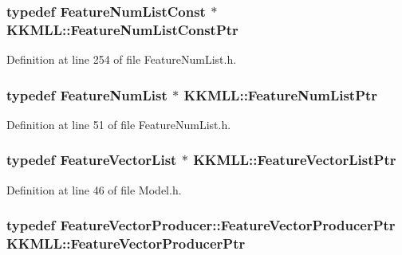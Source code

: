 \subsubsection[{\texorpdfstring{Feature\+Num\+List\+Const\+Ptr}{FeatureNumListConstPtr}}]{\setlength{\rightskip}{0pt plus 5cm}typedef {\bf Feature\+Num\+List\+Const} $\ast$ {\bf K\+K\+M\+L\+L\+::\+Feature\+Num\+List\+Const\+Ptr}}\hypertarget{namespace_k_k_m_l_l_a81284b0a14973267260023f9a72da94a}{}\label{namespace_k_k_m_l_l_a81284b0a14973267260023f9a72da94a}


Definition at line 254 of file Feature\+Num\+List.\+h.

\subsubsection[{\texorpdfstring{Feature\+Num\+List\+Ptr}{FeatureNumListPtr}}]{\setlength{\rightskip}{0pt plus 5cm}typedef {\bf Feature\+Num\+List} $\ast$ {\bf K\+K\+M\+L\+L\+::\+Feature\+Num\+List\+Ptr}}\hypertarget{namespace_k_k_m_l_l_a66661b68121fdcc4154fb73813696dcc}{}\label{namespace_k_k_m_l_l_a66661b68121fdcc4154fb73813696dcc}


Definition at line 51 of file Feature\+Num\+List.\+h.

\subsubsection[{\texorpdfstring{Feature\+Vector\+List\+Ptr}{FeatureVectorListPtr}}]{\setlength{\rightskip}{0pt plus 5cm}typedef {\bf Feature\+Vector\+List} $\ast$ {\bf K\+K\+M\+L\+L\+::\+Feature\+Vector\+List\+Ptr}}\hypertarget{namespace_k_k_m_l_l_acf2ba92a3cf03e2b19674b24ff488ef6}{}\label{namespace_k_k_m_l_l_acf2ba92a3cf03e2b19674b24ff488ef6}


Definition at line 46 of file Model.\+h.

\subsubsection[{\texorpdfstring{Feature\+Vector\+Producer\+Ptr}{FeatureVectorProducerPtr}}]{\setlength{\rightskip}{0pt plus 5cm}typedef {\bf Feature\+Vector\+Producer\+::\+Feature\+Vector\+Producer\+Ptr} {\bf K\+K\+M\+L\+L\+::\+Feature\+Vector\+Producer\+Ptr}}\hypertarget{namespace_k_k_m_l_l_a5fcda00f9ffbd9fb40e02f013be900e3}{}\label{namespace_k_k_m_l_l_a5fcda00f9ffbd9fb40e02f013be900e3}


